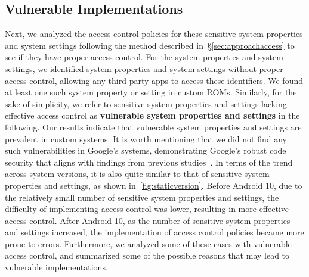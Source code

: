 \subsection{Vulnerable Implementations}
Next, we analyzed the access control policies for these sensitive system properties and system settings following the method described in~\S\ref{sec:approachaccess} to see if they have proper access control.
For the \totalsensitivepropertiescase system properties and \totalsensitivesettingscase system settings, we identified \totaldangerouspropertiescase system properties and \totaldangeroussettingscase system settings without proper access control, allowing any third-party apps to access these identifiers. We found at least one such system property or setting in \totaldangerousdevices custom ROMs.
Similarly, for the sake of simplicity, we refer to sensitive system properties and settings lacking effective access control as \textbf{vulnerable system properties and settings} in the following.
Our results indicate that vulnerable system properties and settings are prevalent in custom systems.
It is worth mentioning that we did not find any such vulnerabilities in Google's systems, demonstrating Google's robust code security that aligns with findings from previous studies~\cite{elsabagh2020firmscope, hou2022large}.
In terms of the trend across system versions, it is also quite similar to that of sensitive system properties and settings, as shown in~\autoref{fig:staticversion}.
Before Android 10, due to the relatively small number of sensitive system properties and settings, the difficulty of implementing access control was lower, resulting in more effective access control.
After Android 10, as the number of sensitive system properties and settings increased, the implementation of access control policies became more prone to errors.
Furthermore, we analyzed some of these cases with vulnerable access control, and summarized some of the possible reasons that may lead to vulnerable implementations.

